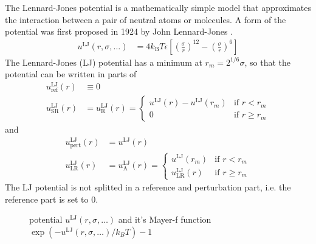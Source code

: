 The Lennard-Jones potential is a mathematically simple model that approximates the interaction
between a pair of neutral atoms or molecules.
A form of the potential was first proposed in 1924 by John Lennard-Jones \cite{Jones1924}.
\begin{align}
u^\text{LJ}(r,\sigma,\ldots) &= 4 k_\text{B}T \epsilon \left[ \left(\frac{\sigma}{r}\right)^{12} - \left(\frac{\sigma}{r}\right)^{6}\right]
\end{align}
The Lennard-Jones (LJ) potential has a minimum at $r_m=2^{1/6} \sigma$, so that the potential can be written in parts of
\begin{align}
u^\text{LJ}_\text{ref}(r) & \equiv 0 \\
u^\text{LJ}_\text{SR}(r)  & = u^\text{LJ}_\text{R}(r) =
\begin{cases}
u^\text{LJ}(r) - u^\text{LJ}(r_m)  & \mbox{if } r <    r_m \\
0                                  & \mbox{if } r \geq r_m
\end{cases}
\end{align}
and
\begin{align}
u^\text{LJ}_\text{pert}(r) &= u^\text{LJ}(r) \\
u^\text{LJ}_\text{LR}(r)   &= u^\text{LJ}_\text{A}(r) =
\begin{cases}
u^\text{LJ}(r_m)          & \mbox{if } r <    r_m \\
u^\text{LJ}_\text{LR}(r)  & \mbox{if } r \geq r_m
\end{cases}
\end{align}
The LJ potential is not splitted in a reference and perturbation part, i.e. the reference part is set to 0.

\begin{figure}[htb]
\captionsetup[subfigure]{position=b}
\centering
{}
\hfill
{}
\caption{potential $u^\text{LJ}(r,\sigma,\ldots)$ and it's Mayer-f function $\exp(-u^\text{LJ}(r,\sigma,\ldots)/k_BT)-1$}
\end{figure}

